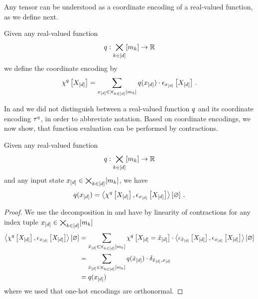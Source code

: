 Any tensor can be understood as a coordinate encoding of a real-valued function, as we define next.

\begin{definition}\label{def:coordinateEncoding}
    Given any real-valued function
    \begin{align*}
        q: \bigtimes_{k\in[d]}[m_{k}] \rightarrow \mathbb{R}
    \end{align*}
    we define the coordinate encoding by
    \begin{align*}
        \chi^{q}\left[X_{[d]}\right]
        = \sum_{x_{[d]}\in\bigtimes_{k\in[d]}[m_{k}]} q(x_{[d]}) \cdot \epsilon_{x_{[d]}}\left[X_{[d]}\right] \, .
    \end{align*}
\end{definition}

In  and  we did not distinguish between a real-valued function $q$ and its coordinate encoding $\tau^{q}$, in order to abbreviate notation.
Based on coordinate encodings, we now show, that function evaluation can be performed by contractions.

\begin{theorem}
    \label{the:coordinateCalculus}
    Given any real-valued function
    \begin{align*}
        q : \bigtimes_{k\in[d]}[m_{k}] \rightarrow \mathbb{R}
    \end{align*}
    and any input state $x_{[d]}\in\bigtimes_{k\in[d]}[m_{k}]$, we have
    \begin{align*}
        q(x_{[d]})
        = \left\langle \chi^{q}\left[X_{[d]}\right],\epsilon_{x_{[d]}}\left[X_{[d]}\right]\right\rangle \left[ \varnothing \right] \, .
    \end{align*}
\end{theorem}
\begin{proof}
    We use the decomposition in  and have by linearity of contractions for any index tuple $x_{[d]}\in\bigtimes_{k\in[d]}[m_{k}]$
    \begin{align*}
        \left\langle \chi^{q}\left[X_{[d]}\right],\epsilon_{x_{[d]}}\left[X_{[d]}\right]\right\rangle \left[ \varnothing \right]
        & = \sum_{\tilde{x}_{[d]}\in\bigtimes_{k\in[d]}[m_{k}]}
        \chi^{q}\left[X_{[d]}=\tilde{x}_{[d]}\right]
        \cdot \left\langle \epsilon_{\tilde{x}_{[d]}}\left[X_{[d]}\right],\epsilon_{x_{[d]}}\left[X_{[d]}\right]\right\rangle \left[ \varnothing \right] \\
        & = \sum_{\tilde{x}_{[d]}\in\bigtimes_{k\in[d]}[m_{k}]}
        q(\tilde{x}_{[d]})
        \cdot \delta_{\tilde{x}_{[d]},x_{[d]}} \\
        & = q(x_{[d]})
    \end{align*}
    where we used that one-hot encodings are orthonormal.
\end{proof}

